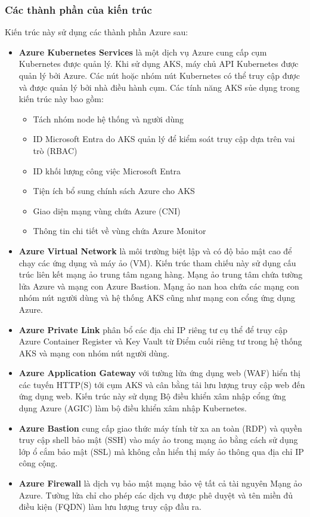 \subsubsection{Các thành phần của kiến trúc}
Kiến trúc này sử dụng các thành phần Azure sau:
\begin{itemize}
    \item \textbf{Azure Kubernetes Services} là một dịch vụ Azure cung cấp cụm Kubernetes được quản lý. Khi sử dụng AKS, máy chủ API Kubernetes được quản lý bởi Azure. Các nút hoặc nhóm nút Kubernetes có thể truy cập được và được quản lý bởi nhà điều hành cụm.
    Các tính năng AKS sủe dụng trong kiến trúc này bao gồm:
    \begin{itemize}
        \item Tách nhóm node hệ thống và người dùng
        \item ID Microsoft Entra do AKS quản lý để kiểm soát truy cập dựa trên vai trò (RBAC)
        \item ID khối lượng công việc Microsoft Entra
        \item Tiện ích bổ sung chính sách Azure cho AKS
        \item Giao diện mạng vùng chứa Azure (CNI)
        \item Thông tin chi tiết về vùng chứa Azure Monitor
    \end{itemize} 
    \item \textbf{Azure Virtual Network} là môi trường biệt lập và có độ bảo mật cao để chạy các ứng dụng và máy ảo (VM). Kiến trúc tham chiếu này sử dụng cấu trúc liên kết mạng ảo trung tâm ngang hàng. Mạng ảo trung tâm chứa tường lửa Azure và mạng con Azure Bastion. Mạng ảo nan hoa chứa các mạng con nhóm nút người dùng và hệ thống AKS cũng như mạng con cổng ứng dụng Azure.
    \item  \textbf{Azure Private Link} phân bổ các địa chỉ IP riêng tư cụ thể để truy cập Azure Container Register và Key Vault từ Điểm cuối riêng tư trong hệ thống AKS và mạng con nhóm nút người dùng.
    \item \textbf{Azure Application Gateway} với tường lửa ứng dụng web (WAF) hiển thị các tuyến HTTP(S) tới cụm AKS và cân bằng tải lưu lượng truy cập web đến ứng dụng web. Kiến trúc này sử dụng Bộ điều khiển xâm nhập cổng ứng dụng Azure (AGIC) làm bộ điều khiển xâm nhập Kubernetes.
    \item \textbf{Azure Bastion} cung cấp giao thức máy tính từ xa an toàn (RDP) và quyền truy cập shell bảo mật (SSH) vào máy ảo trong mạng ảo bằng cách sử dụng lớp ổ cắm bảo mật (SSL) mà không cần hiển thị máy ảo thông qua địa chỉ IP công cộng.
    \item \textbf{Azure Firewall} là dịch vụ bảo mật mạng bảo vệ tất cả tài nguyên Mạng ảo Azure. Tường lửa chỉ cho phép các dịch vụ được phê duyệt và tên miền đủ điều kiện (FQDN) làm lưu lượng truy cập đầu ra. 
\end{itemize}
